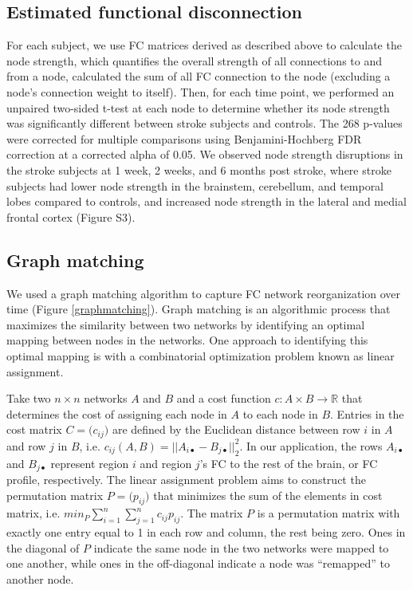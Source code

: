 \documentclass[phd,tocprelim]{cornell}
\begin{document}
	\subsection*{Estimated functional disconnection}
	For each subject, we use FC matrices derived as described above to calculate the node strength, which quantifies the overall strength of all connections to and from a node, calculated the sum of all FC connection to the node (excluding a node's connection weight to itself). Then, for each time point, we performed an unpaired two-sided t-test at each node to determine whether its node strength was significantly different between stroke subjects and controls. The 268 p-values were corrected for multiple comparisons using Benjamini-Hochberg FDR correction at a corrected alpha of 0.05. We observed node strength disruptions in the stroke subjects at 1 week, 2 weeks, and 6 months post stroke, where stroke subjects had lower node strength in the brainstem, cerebellum, and temporal lobes compared to controls, and increased node strength in the lateral and medial frontal cortex (Figure S3).
	
	\subsection{Graph matching}
	We used a graph matching algorithm to capture FC network reorganization over time (Figure \ref{graphmatching}). Graph matching is an algorithmic process that maximizes the similarity between two networks by identifying an optimal mapping between nodes in the networks. One approach to identifying this optimal mapping is with a combinatorial optimization problem known as linear assignment. 
	
	Take two $n \times n $ networks $A$ and $B$ and a cost function $c: A \times B \rightarrow  \mathbb{R}$  that determines the cost of assigning each node in $A$ to each node in $B$. Entries in the cost matrix $C = \big(c_{i j}\big)$ are defined by the Euclidean distance between row $i$ in $A$ and row $j$ in $B$, i.e. $c_{ij}(A,B)=|| A_{i\bullet}-B_{j \bullet} ||^2_2$. In our application, the rows $A_{i\bullet}$ and $B_{j \bullet}$ represent region $i$ and region $j$'s FC to the rest of the brain, or FC profile, respectively. The linear assignment problem aims to construct the permutation matrix $P = \big(p_{i j}\big)$ that minimizes the sum of the elements in cost matrix, i.e. $min_P\sum^n_{i=1}\sum^n_{j=1}c_{ij}p_{ij}$. The matrix $P$ is a permutation matrix with exactly one entry equal to 1 in each row and column, the rest being zero. Ones in the diagonal of $P$ indicate the same node in the two networks were mapped to one another, while ones in the off-diagonal indicate a node was “remapped” to another node.
	
\end{document}
